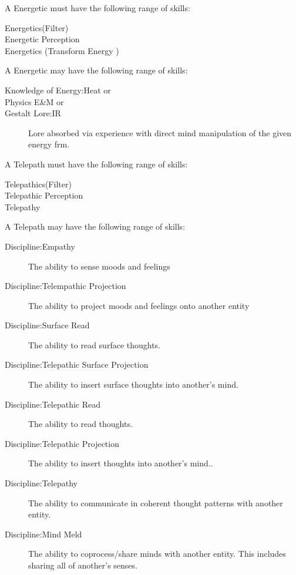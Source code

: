 \documentclass{book}
\begin{document}
A Energetic must have the following range of skills:

\begin{description}
    \item[Energetics(Filter)]
    \item[Energetic Perception]
    \item[Energetics (Transform Energy )]
\end{description}

A Energetic may have the following range of skills:

\begin{description}
    \item[Knowledge of Energy:Heat or]
    \item[Physics E\&M or]
    \item[Gestalt Lore:IR]
    Lore absorbed via experience with direct mind manipulation of the
    given energy frm.
\end{description}

A Telepath must have the following range of skills:

\begin{description}
    \item[Telepathics(Filter)]
    \item[Telepathic Perception]
    \item[Telepathy]
\end{description}

A Telepath may have the following range of skills:

\begin{description}
    \item[Discipline:Empathy]
    The ability to sense moods and feelings
    \item[Discipline:Telempathic Projection]
    The ability to project moods and feelings onto another entity
    \item[Discipline:Surface Read]
    The ability to read surface thoughts.
    \item[Discipline:Telepathic Surface Projection]
    The ability to insert surface thoughts into another's mind.
    \item[Discipline:Telepathic Read]
    The ability to read thoughts.
    \item[Discipline:Telepathic Projection]
    The ability to insert thoughts into another's mind..
    \item[Discipline:Telepathy]
    The ability to communicate in coherent thought patterns with another
    entity.
    \item[Discipline:Mind Meld]
    The ability to coprocess/share minds with another entity. This
    includes sharing all of another's senses.
\end{description}
\end{document}
